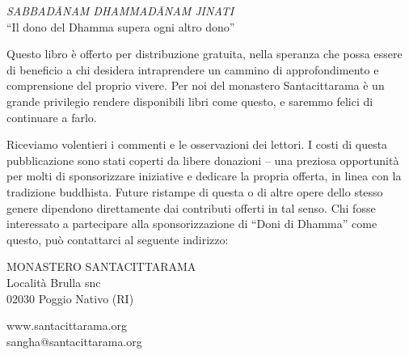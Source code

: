 
{\centering\par
\Large
\textit{SABBADĀNAM DHAMMADĀNAM JINATI}\\
“Il dono del Dhamma supera ogni altro dono”
\par}
\vspace*{2\baselineskip}


\setlength{\parskip}{1.0em}
\setlength{\parindent}{0pt}

Questo libro è offerto per distribuzione gratuita, nella speranza che possa essere di beneficio a chi desidera intraprendere un cammino di approfondimento e comprensione del proprio vivere. Per noi del monastero Santacittarama è un grande privilegio rendere disponibili libri come questo, e saremmo felici di continuare a farlo.

Riceviamo volentieri i commenti e le osservazioni dei lettori. I costi di questa pubblicazione sono stati coperti da libere donazioni – una preziosa opportunità per molti di sponsorizzare iniziative e dedicare la propria offerta, in linea con la tradizione buddhista. Future ristampe di questa o di altre opere dello stesso genere dipendono direttamente dai contributi offerti in tal senso. Chi fosse interessato a partecipare alla sponsorizzazione di “Doni di Dhamma” come questo, può contattarci al seguente indirizzo:

{\centering\par\small
MONASTERO SANTACITTARAMA\\
Località Brulla snc\\
02030 Poggio Nativo (RI)

www.santacittarama.org\\
sangha@santacittarama.org
\par} 



